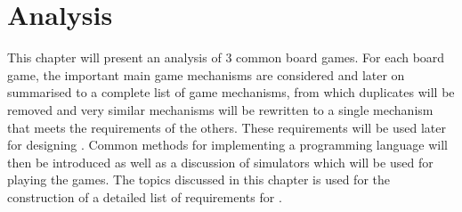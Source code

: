\chapter{Analysis}
This chapter will present an analysis of 3 common board games. For each board game, the important main game mechanisms are considered and later on summarised to a complete list of game mechanisms, from which duplicates will be removed and very similar mechanisms will be rewritten to a single mechanism that meets the requirements of the others. These requirements will be used later for designing \productname{}. Common methods for implementing a programming language will then be introduced as well as a discussion of simulators which will be used for playing the \productname{} games. The topics discussed in this chapter is used for the construction of a detailed list of requirements for \productname{}.






%


%




